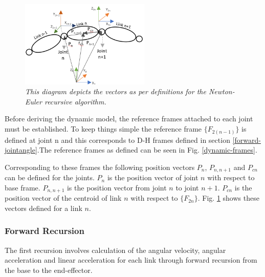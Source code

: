\documentclass[a4paper,12pt]{report}
\begin{document}
\begin{figure}
	\centering
	\vspace{-10pt}
	\includegraphics[width=0.55\textwidth]{images/link vector definitions.png}
	\caption{\textit{ This diagram depicts the vectors as per definitions for the Newton-Euler recursive algorithm.}}
	\label{vector-definitions-NER}
	\vspace{-20pt}
\end{figure}

Before deriving the dynamic model, the reference frames attached to each joint must be established. To keep things simple the reference frame $\{F_{2(n-1)}\}$ is defined at joint n and this corresponds to D-H frames defined in section \ref{forward-jointangle}.The reference frames as defined can be seen in Fig. \ref{dynamic-frames}.


Corresponding to these frames the following position vectors $P_n$, $P_{n,n+1}$ and $P_{cn}$ can be defined for the joints. $P_n$ is the position vector of joint $n$ with respect to base frame. $P_{n,n+1}$ is the position vector from joint $n$ to joint $n+1$. $P_{cn}$ is the position vector of the centroid of link $n$ with respect to $\{F_{2n}\}$. Fig. \ref{vector-definitions-NER} shows these vectors defined for a link $n$.


\subsubsection{Forward Recursion}
The first recursion involves calculation of the angular velocity, angular acceleration and linear acceleration for each link through forward recursion from the base to the end-effector. 
\end{document}
